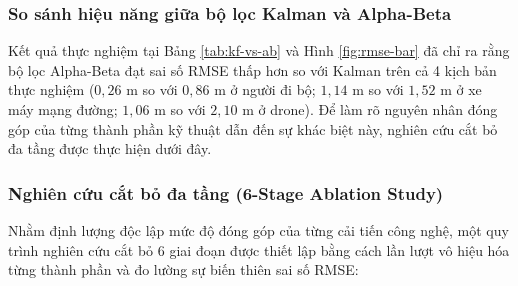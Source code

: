 \subsubsection{So sánh hiệu năng giữa bộ lọc Kalman và Alpha-Beta}

\hspace{0.5cm} Kết quả thực nghiệm tại Bảng \ref{tab:kf-vs-ab} và Hình \ref{fig:rmse-bar} đã chỉ ra rằng bộ lọc Alpha-Beta đạt sai số RMSE thấp hơn so với Kalman trên cả 4 kịch bản thực nghiệm ($0{,}26$ m so với $0{,}86$ m ở người đi bộ; $1{,}14$ m so với $1{,}52$ m ở xe máy mạng đường; $1{,}06$ m so với $2{,}10$ m ở drone). Để làm rõ nguyên nhân đóng góp của từng thành phần kỹ thuật dẫn đến sự khác biệt này, nghiên cứu cắt bỏ đa tầng được thực hiện dưới đây.


\subsubsection{Nghiên cứu cắt bỏ đa tầng (6-Stage Ablation Study)}

\hspace{0.5cm} Nhằm định lượng độc lập mức độ đóng góp của từng cải tiến công nghệ, một quy trình nghiên cứu cắt bỏ 6 giai đoạn được thiết lập bằng cách lần lượt vô hiệu hóa từng thành phần và đo lường sự biến thiên sai số RMSE:

\begin{table}[H]
\centering
\caption{Ma trận nghiên cứu cắt bỏ đa tầng định lượng mức độ đóng góp của từng thành phần}
\label{tab:ablation-8stages}
\end{table}

